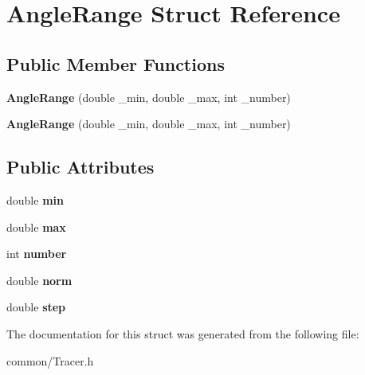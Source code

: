\hypertarget{struct_angle_range}{}\section{Angle\+Range Struct Reference}
\label{struct_angle_range}
\subsection*{Public Member Functions}
\begin{DoxyCompactItemize}
\item 
\mbox{\label{struct_angle_range_a1e06292811856a2dc9cbf549301ed75a}} 
{\bfseries Angle\+Range} (double \+\_\+min, double \+\_\+max, int \+\_\+number)
\item 
\mbox{\label{struct_angle_range_a1e06292811856a2dc9cbf549301ed75a}} 
{\bfseries Angle\+Range} (double \+\_\+min, double \+\_\+max, int \+\_\+number)
\end{DoxyCompactItemize}
\subsection*{Public Attributes}
\begin{DoxyCompactItemize}
\item 
\mbox{\label{struct_angle_range_a5ed72ddb7e883e7d2d69ce7fa8be2563}} 
double {\bfseries min}
\item 
\mbox{\label{struct_angle_range_af38a8ccf521d7d1cc1a75dad6862411e}} 
double {\bfseries max}
\item 
\mbox{\label{struct_angle_range_aaef49ba68e00ca42532d7e125a1be312}} 
int {\bfseries number}
\item 
\mbox{\label{struct_angle_range_a50723e28b1743ddd4300b76a427d612b}} 
double {\bfseries norm}
\item 
\mbox{\label{struct_angle_range_a0428fa2639bc62cead723624c4342c19}} 
double {\bfseries step}
\end{DoxyCompactItemize}


The documentation for this struct was generated from the following file\+:\begin{DoxyCompactItemize}
\item 
common/Tracer.\+h\end{DoxyCompactItemize}

